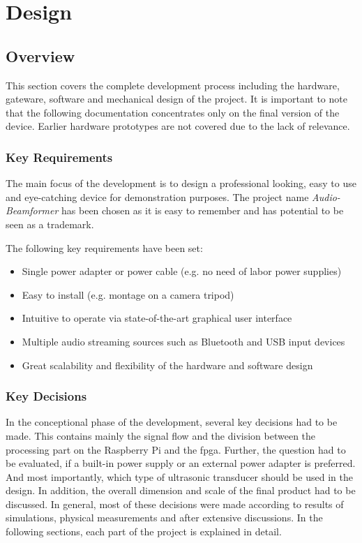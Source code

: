 \chapter{Design}
\section{Overview}
This section covers the complete development process including the hardware, gateware, software and mechanical design of the project. It is important to note that the following documentation concentrates only on the final version of the device. Earlier hardware prototypes are not covered due to the lack of relevance.

\subsection{Key Requirements}
The main focus of the development is to design a professional looking, easy to use and eye-catching device for demonstration purposes. The project name \textit{Audio-Beamformer} has been chosen as it is easy to remember and has potential to be seen as a trademark. 

The following key requirements have been set:
\begin{itemize}
    \item Single power adapter or power cable (e.g. no need of labor power supplies) 
    \item Easy to install (e.g. montage on a camera tripod)
    \item Intuitive to operate via state-of-the-art graphical user interface
    \item Multiple audio streaming sources such as Bluetooth and USB input devices
    \item Great scalability and flexibility of the hardware and software design
\end{itemize}

\subsection{Key Decisions}
In the conceptional phase of the development, several key decisions had to be made. This contains mainly the signal flow and the division between the processing part on the Raspberry Pi and the \acrshort{fpga}. Further, the question had to be evaluated, if a built-in power supply or an external power adapter is preferred. And most importantly, which type of ultrasonic transducer should be used in the design.
In addition, the overall dimension and scale of the final product had to be discussed. 
In general, most of these decisions were made according to results of simulations, physical measurements and after extensive discussions.
In the following sections, each part of the project is explained in detail.


